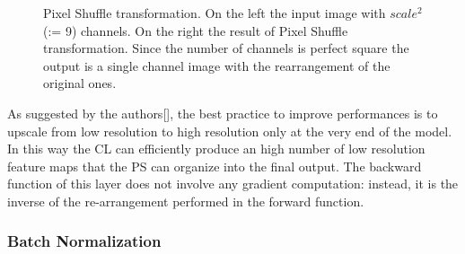 \documentclass[a4paper, 10pt]{book}
\begin{document}
 \begin{figure}[H]
        \centering
        
        \caption{Pixel Shuffle transformation.
On the left the input image with $scale^2$ (:= 9) channels.
On the right the result of Pixel Shuffle transformation.
Since the number of channels is perfect square the output is a single channel image with the rearrangement of the original ones.
}
\label{fig:pixel_shuffle_sr}
\end{figure}

    
As suggested by the authors[], the best practice to improve performances is to upscale from low resolution to high resolution only at the very end of the model. In this way the CL can efficiently produce an high number of low resolution feature maps that the PS can organize into the final output.
The backward function of this layer does not involve any gradient computation: instead, it is the inverse of the re-arrangement performed in the forward function.

\subsubsection{Batch Normalization}
\end{document}
